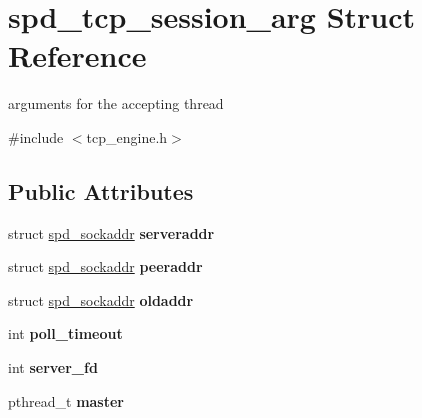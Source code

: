 \hypertarget{structspd__tcp__session__arg}{
\section{spd\_\-tcp\_\-session\_\-arg Struct Reference}
\label{structspd__tcp__session__arg}
}


arguments for the accepting thread  




{\ttfamily \#include $<$tcp\_\-engine.h$>$}

\subsection*{Public Attributes}
\begin{DoxyCompactItemize}
\item 
\hypertarget{structspd__tcp__session__arg_add2916fad7ffe730b717a2eaa3af1777}{
struct \hyperlink{structspd__sockaddr}{spd\_\-sockaddr} {\bfseries serveraddr}}
\label{structspd__tcp__session__arg_add2916fad7ffe730b717a2eaa3af1777}

\item 
\hypertarget{structspd__tcp__session__arg_abd229c8c704c199499058a8454636423}{
struct \hyperlink{structspd__sockaddr}{spd\_\-sockaddr} {\bfseries peeraddr}}
\label{structspd__tcp__session__arg_abd229c8c704c199499058a8454636423}

\item 
\hypertarget{structspd__tcp__session__arg_a6eb3e070fd300b6375b5317a1f53f435}{
struct \hyperlink{structspd__sockaddr}{spd\_\-sockaddr} {\bfseries oldaddr}}
\label{structspd__tcp__session__arg_a6eb3e070fd300b6375b5317a1f53f435}

\item 
\hypertarget{structspd__tcp__session__arg_a669ffe34776a3367e6225a627a502e6f}{
int {\bfseries poll\_\-timeout}}
\label{structspd__tcp__session__arg_a669ffe34776a3367e6225a627a502e6f}

\item 
\hypertarget{structspd__tcp__session__arg_a56b3185eab5ef4eb745bd36de1881038}{
int {\bfseries server\_\-fd}}
\label{structspd__tcp__session__arg_a56b3185eab5ef4eb745bd36de1881038}

\item 
\hypertarget{structspd__tcp__session__arg_ab8202b971e2506ae78abe9d595bd42f4}{
pthread\_\-t {\bfseries master}}
\label{structspd__tcp__session__arg_ab8202b971e2506ae78abe9d595bd42f4}


\end{DoxyCompactItemize}
